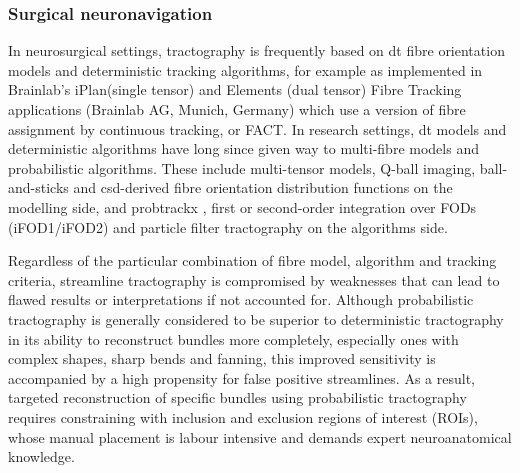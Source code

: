 
\subsubsection{Surgical neuronavigation}



In neurosurgical settings, tractography is frequently based on \gls{dt} fibre orientation models \autocite{Toescu2020, Yang2021} and deterministic tracking algorithms, for example as implemented in Brainlab's iPlan\textregistered (single tensor)\autocite{Brainlab2012} and Elements (dual tensor)\autocite{Sollmann2020a} Fibre Tracking applications (Brainlab AG, Munich, Germany) which use a version of fibre assignment by continuous tracking, or FACT. \autocite{Mori1999}
In research settings, \gls{dt} models and deterministic algorithms have long since given way to multi-fibre models and probabilistic algorithms.
These include multi-tensor models,\autocite{Peled2006} Q-ball imaging\autocite{Tuch2004}, ball-and-sticks\autocite{Behrens2003} and \gls{csd}-derived fibre orientation distribution functions on the modelling side, and probtrackx \autocite{Behrens2007}, first or second-order integration over FODs (iFOD1/iFOD2)\autocite{Tournier2010} and particle filter tractography \autocite{Girard2014} on the algorithms side.

Regardless of the particular combination of fibre model, algorithm and tracking criteria, streamline tractography is compromised by weaknesses that can lead to flawed results or interpretations if not accounted for.\autocite{Rheault2020, Schilling2022, Schilling2019}
Although probabilistic tractography is generally considered to be superior to deterministic tractography in its ability to reconstruct bundles more completely, especially ones with complex shapes, sharp bends and fanning, this improved sensitivity is accompanied by a high propensity for false positive streamlines.\autocite{Maier-Hein2017}
As a result, targeted reconstruction of specific bundles using probabilistic tractography requires constraining with inclusion and exclusion regions of interest (ROIs), whose manual placement is labour intensive and demands expert neuroanatomical knowledge.

